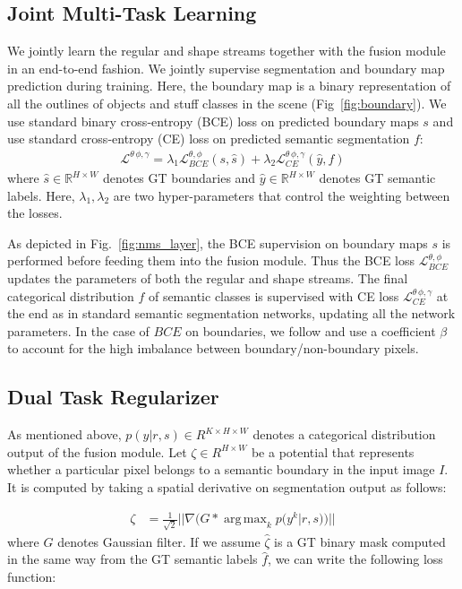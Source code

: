 \documentclass[10pt,twocolumn,letterpaper]{article}
\DeclareMathOperator*{\argmax}{arg\,max}
\begin{document}
\subsection{Joint Multi-Task Learning}
We jointly learn the regular and shape streams together with the fusion module in an end-to-end fashion. 
We jointly supervise segmentation and boundary map prediction during training. 
Here, the boundary map is a binary representation of all the outlines of objects and stuff classes in the scene (Fig~\ref{fig:boundary}). 
We use standard binary cross-entropy (BCE) loss on predicted boundary maps $s$ and use standard cross-entropy (CE) loss on predicted semantic segmentation $f$:
\begin{align}
\label{eqn_multi_task_loss}
\mathcal{L}^{\theta\,\phi,\gamma}= \lambda_1 \mathcal{L}^{\theta,\phi}_{BCE}(s, \hat{s})+\lambda_2 \mathcal{L}^{\theta\,\phi,\gamma}_{CE}(\hat{y},f)
\end{align}
where $\hat{s} \in \mathbb{R}^{H \times W}$ denotes GT boundaries and $\hat{y} \in \mathbb{R}^{H \times W}$ denotes GT semantic labels.
Here, $\lambda_1,\lambda_2$ are two hyper-parameters that control the weighting between the losses.

As depicted in Fig.~\ref{fig:nms_layer}, the BCE supervision on boundary maps $s$ is performed before feeding them into the fusion module. Thus the BCE loss $\mathcal{L}^{\theta,\phi}_{BCE}$ updates the parameters of both the regular and shape streams.
The final categorical distribution $f$ of semantic classes is supervised with CE loss $\mathcal{L}^{\theta\,\phi,\gamma}_{CE}$ at the end as in standard semantic segmentation networks, updating all the network parameters.
In the case of $BCE$ on boundaries, we follow \cite{xie2015hed,yu2017casenet} and use a coefficient $\beta$ to account for the high imbalance between boundary/non-boundary pixels. 

\subsection{Dual Task Regularizer} 
As mentioned above, $p(y|r,s) \in R^{K\times H\times W}$ denotes a categorical distribution output of the fusion module.
Let $\zeta \in R^{H\times W}$ be a potential that represents whether a particular pixel belongs to a semantic boundary in the input image $I$. It is computed by taking a spatial derivative on segmentation output as follows:

\vspace{-5mm}
\begin{align}
	\label{eqn:g}
\zeta &=\frac{1}{\sqrt{2}}||\nabla(G*\argmax_k p(y^k| r,s))||
\end{align}
where $G$ denotes Gaussian filter. If we assume $\hat \zeta$ is a GT binary mask computed in the same way from the GT semantic labels $\hat{f}$, we can write the following loss function:
\end{document}
